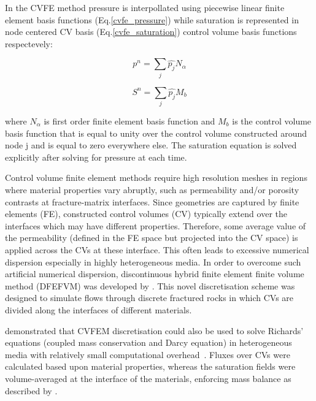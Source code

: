 \documentclass[preprint,authoryear,12pt]{elsarticle}
\begin{document}
In the CVFE method pressure is interpollated using piecewise linear finite element basis functions (Eq.\ref{cvfe_pressure}) while saturation is represented in node centered CV basis (Eq.\ref{cvfe_saturation}) control volume basis functions respectevely:

\begin{equation}
 p^{n} = \sum_{j} \hat{p_{j}} N_{\alpha} 
\label{cvfe_pressure}
\end{equation}

\begin{equation}
 S^{n} = \sum_{j} \hat{p_{j}} M_{b} 
\label{cvfe_saturation}
\end{equation}

where $N_{\alpha}$ is first order finite element basis function and $M_{b}$ is the control volume basis function that is equal to unity over the control volume constructed around node j and is equal to zero everywhere else. The saturation equation is solved explicitly after solving for pressure at each time.

Control volume finite element methods require high resolution meshes in regions where material properties vary abruptly, such as permeability and/or porosity contrasts at fracture-matrix interfaces. Since geometries are captured by finite elements (FE), constructed control volumes (CV) typically extend over the interfaces which may have different properties. Therefore, some average value of the permeability (defined in the FE space but projected into the CV space) is applied across the CVs at these interface. This often leads to excessive numerical dispersion especially in highly heterogeneous media. In order to overcome such artificial numerical dispersion, discontinuous hybrid finite element finite volume method (DFEFVM) was developed by \citet{nick_2011b, nick_2011a}. This novel discretisation scheme was designed to simulate flows through discrete fractured rocks in which CVs are divided along the interfaces of different materials.  

\citet{cumming_2011} demonstrated that CVFEM discretisation could also be used to solve Richards' equations (coupled mass conservation and Darcy equation) in heterogeneous media with relatively small computational overhead~\citep[compared with traditional coupled velocity-pressure based formulations, see also][]{cumming_phd2012}. Fluxes over CVs were calculated based upon material properties, whereas the saturation fields were volume-averaged at the interface of the materials, enforcing mass balance as described by \citet{kirkland_1992}.
\end{document}
